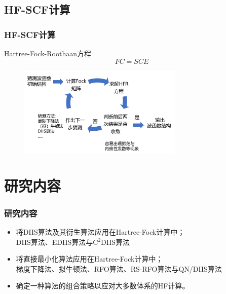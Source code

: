 \documentclass[10pt,aspectratio=43,mathserif,UTF8]{beamer}
\begin{document}
\subsection{HF-SCF计算}
\begin{frame}
\frametitle{HF-SCF计算}
Hartree-Fock-Roothaan方程
\begin{equation}
	FC=SCE
\end{equation}

\begin{figure}[htbp]
	\centering
	\includegraphics[width=0.7\textwidth]{figure/HF/HF_process2.png}
\end{figure}
\end{frame}


\section{研究内容}
\begin{frame}
\frametitle{研究内容}
	\begin{itemize}
		\item 将DIIS算法及其衍生算法应用在Hartree-Fock计算中；\\
		DIIS算法、EDIIS算法与C$^2$DIIS算法
		\item 将直接最小化算法应用在Hartree-Fock计算中；\\
		梯度下降法、拟牛顿法、RFO算法、RS-RFO算法与QN/DIIS算法
		\item 确定一种算法的组合策略以应对大多数体系的HF计算。
	\end{itemize}

\end{frame}


\end{document}
